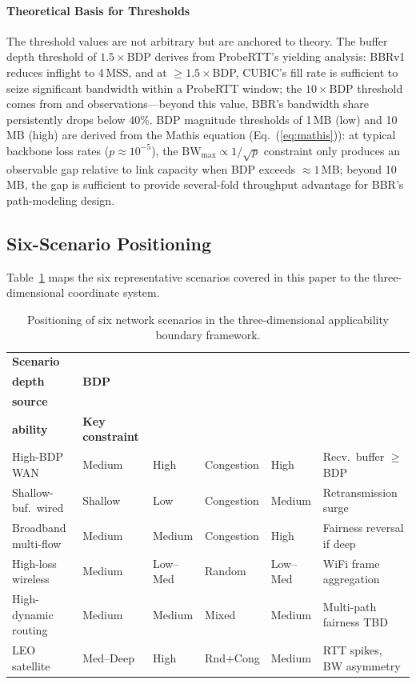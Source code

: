 \documentclass[a4paper,fleqn]{cas-sc}
\begin{document}
\paragraph{Theoretical Basis for Thresholds}
The threshold values are not arbitrary but are anchored to theory. The buffer
depth threshold of $1.5\times$BDP derives from ProbeRTT's yielding analysis:
BBRv1 reduces inflight to 4\,MSS, and at $\geq1.5\times$BDP, CUBIC's fill rate
is sufficient to seize significant bandwidth within a ProbeRTT window; the
$10\times$BDP threshold comes from \citet{cao2019bbr} and \citet{jaeger2019bbr}
observations---beyond this value, BBR's bandwidth share persistently drops below
40\%. BDP magnitude thresholds of 1\,MB (low) and 10\,MB (high) are derived from
the Mathis equation (Eq.~(\ref{eq:mathis})): at typical backbone loss rates
($p\approx10^{-5}$), the $\mathrm{BW}_{\max}\propto 1/\sqrt{p}$ constraint only
produces an observable gap relative to link capacity when BDP exceeds
$\approx1$\,MB; beyond 10\,MB, the gap is sufficient to provide several-fold
throughput advantage for BBR's path-modeling design.

\subsection{Six-Scenario Positioning}
\label{sec:framework_pos}

Table~\ref{tab:framework} maps the six representative scenarios covered in this
paper to the three-dimensional coordinate system.

\begin{table}[pos=tbp]
  \caption{Positioning of six network scenarios in the three-dimensional
    applicability boundary framework.}
  \label{tab:framework}
  \small
  \begin{tabularx}{\tblwidth}{@{}p{2.1cm}p{1.3cm}p{1.2cm}p{1.5cm}p{1.6cm}X@{}}
    \toprule
    \textbf{Scenario} & \makecell[l]{\textbf{Buffer}\\\textbf{depth}} & \textbf{BDP}
      & \makecell[l]{\textbf{Loss}\\\textbf{source}} & \makecell[l]{\textbf{Suit-}\\\textbf{ability}}
      & \textbf{Key constraint} \\
    \midrule
    High-BDP WAN & Medium & High & Congestion & High & Recv.\ buffer $\geq$ BDP \\
    Shallow-buf.\ wired & Shallow & Low & Congestion & Medium & Retransmission surge \\
    Broadband multi-flow & Medium & Medium & Congestion & High & Fairness reversal if deep \\
    High-loss wireless & Medium & Low--Med & Random & Low--Med & WiFi frame aggregation \\
    High-dynamic routing & Medium & Medium & Mixed & Medium & Multi-path fairness TBD \\
    LEO satellite & Med--Deep & High & Rnd+Cong & Medium & RTT spikes, BW asymmetry \\
    \bottomrule
  \end{tabularx}
\end{table}
\end{document}
